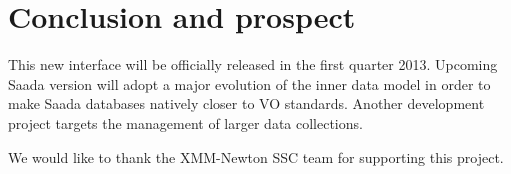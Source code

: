 \section {Conclusion and prospect}
This new interface will be officially released in the first quarter 2013. Upcoming Saada version will adopt a major evolution of the inner data model in order to make Saada databases natively closer to VO standards. Another development project targets the management of larger data collections.

\acknowledgements We would like to thank the XMM-Newton SSC team for supporting this project.



